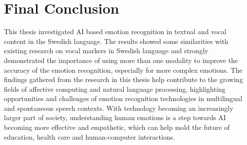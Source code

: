 \section{Final Conclusion}
\label{sec:con-final-conclusion}
This thesis investigated AI based emotion recognition in textual and vocal content in the Swedish language. The results showed some similarities with existing research on vocal markers in Swedish language and strongly demonstrated the importance of using more than one modality to improve the accuracy of the emotion recognition, especially for more complex emotions. 
The findings gathered from the research in this thesis help contribute to the growing fields of affective computing and natural language processing, highlighting opportunities and challenges of emotion recognition technologies in multilingual and spontaneous speech contexts. With technology becoming an increasingly larger part of society, understanding human emotions is a step towards AI becoming more effective and empathetic, which can help mold the future of education, health care and human-computer interactions.

